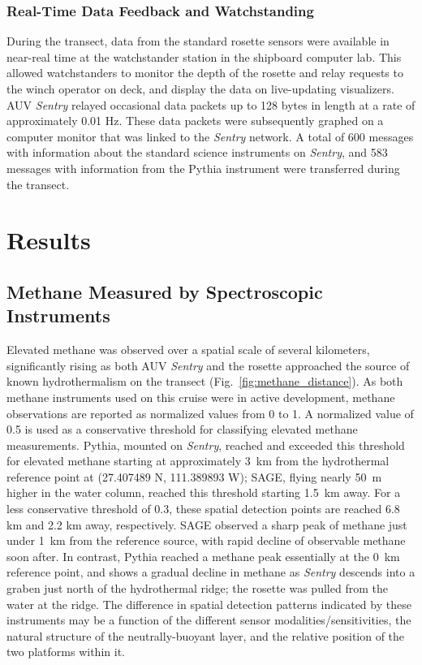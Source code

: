\subsubsection{Real-Time Data Feedback and Watchstanding}
During the transect, data from the standard rosette sensors were available in near-real time at the watchstander station in the shipboard computer lab. This allowed watchstanders to monitor the depth of the rosette and relay requests to the winch operator on deck, and display the data on live-updating visualizers. AUV \emph{Sentry} relayed occasional data packets up to 128 bytes in length at a rate of approximately 0.01 Hz. These data packets were subsequently graphed on a computer monitor that was linked to the \emph{Sentry} network. A total of 600 messages with information about the standard science instruments on \emph{Sentry}, and 583 messages with information from the Pythia instrument were transferred during the transect.

\section{Results}
\label{sec:afar_results}

\subsection{Methane Measured by Spectroscopic Instruments}
\label{sec:methane_results}
Elevated methane was observed over a spatial scale of several kilometers, significantly rising as both AUV \emph{Sentry} and the rosette approached the source of known hydrothermalism on the transect (Fig.~\ref{fig:methane_distance}). As both methane instruments used on this cruise were in active development, methane observations are reported as normalized values from 0 to 1. A normalized value of 0.5 is used as a conservative threshold for classifying elevated methane measurements. Pythia, mounted on \emph{Sentry}, reached and exceeded this threshold for elevated methane starting at approximately \SI{3}{\kilo\meter} from the hydrothermal reference point at (27.407489 N, 111.389893 W); SAGE, flying nearly \SI{50}{\meter} higher in the water column, reached this threshold starting \SI{1.5}{\kilo\meter} away. For a less conservative threshold of 0.3, these spatial detection points are reached 6.8 km and 2.2 km away, respectively. SAGE observed a sharp peak of methane just under \SI{1}{\kilo\meter} from the reference source, with rapid decline of observable methane soon after. In contrast, Pythia reached a methane peak essentially at the \SI{0}{\kilo\meter} reference point, and shows a gradual decline in methane as \emph{Sentry} descends into a graben just north of the hydrothermal ridge; the rosette was pulled from the water at the ridge. The difference in spatial detection patterns indicated by these instruments may be a function of the different sensor modalities/sensitivities, the natural structure of the neutrally-buoyant layer, and the relative position of the two platforms within it. 

